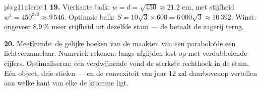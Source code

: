 \begin{solution}{pb:g11:deriv:1}
\textbf{19.} Vierkante balk: $w = d = \sqrt{450} \approx 21.2$ cm, met
stijfheid $w^3 = 450^{3/2} \approx 9\,546$. Optimale balk:
$S = 10\sqrt3 \times 600 = 6\,000\sqrt3 \approx 10\,392$. Winst: ongeveer
$8.9\,\%$ meer stijfheid uit dezelfde stam --- de  betaalt de
zagerij terug.

\textbf{20.} Meetkunde: de gelijke hoeken van de  maakten van een
paraboloïde een lichtverzamelaar. Numeriek rekenen: langs 
afglijden lost  op met verdubbelende cijfers. Optimaliseren:
een verdwijnende  vond de sterkste rechthoek in de stam. Eén
object, drie stielen --- en de convexiteit van jaar 12 zal daarbovenop
vertellen aan welke kant van elke  de kromme ligt.
\end{solution}
